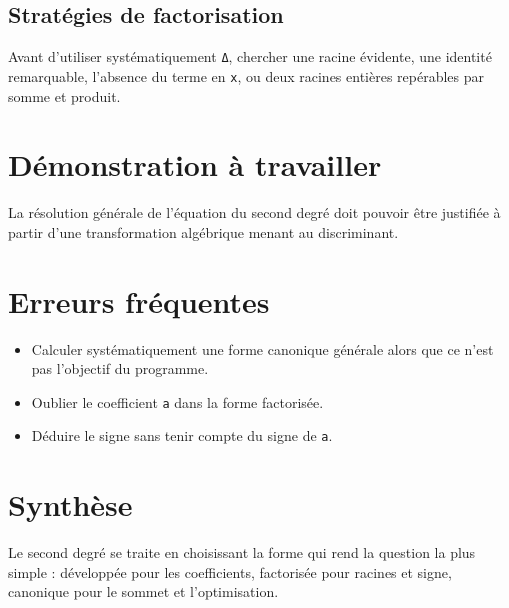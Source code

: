 \subsection{Stratégies de factorisation}
Avant d'utiliser systématiquement \texttt{Δ}, chercher une racine évidente, une identité remarquable, l'absence du terme en \texttt{x}, ou deux racines entières repérables par somme et produit.

\section{Démonstration à travailler}
La résolution générale de l'équation du second degré doit pouvoir être justifiée à partir d'une transformation algébrique menant au discriminant.

\section{Erreurs fréquentes}
\begin{itemize}
\item Calculer systématiquement une forme canonique générale alors que ce n'est pas l'objectif du programme.
\item Oublier le coefficient \texttt{a} dans la forme factorisée.
\item Déduire le signe sans tenir compte du signe de \texttt{a}.
\end{itemize}

\section{Synthèse}
Le second degré se traite en choisissant la forme qui rend la question la plus simple : développée pour les coefficients, factorisée pour racines et signe, canonique pour le sommet et l'optimisation.
